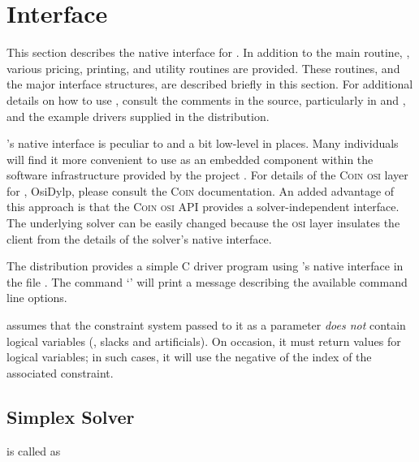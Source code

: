 \section{\dylp Interface}
\label{sec:DylpInterface}

This section describes the native interface for \dylp.
In addition to the main routine, , various pricing, printing, and
utility routines are provided.
These routines, and the major interface structures, are described briefly
in this section.
For additional details on how to use \dylp, consult the comments
in the source, particularly in  and ,
and the example drivers supplied in the distribution.

\dylp's native interface is peculiar to \dylp and a bit low-level in places.
Many individuals will find it more convenient to use \dylp as an
embedded component within the software infrastructure provided by
the \coin project \cite{COIN}.
For details of the \textsc{Coin osi} layer for \dylp, OsiDylp, please consult
the \textsc{Coin}
documentation.
An added advantage of this approach is that the \textsc{Coin osi} API provides
a solver-independent interface.
The underlying solver can be easily changed because the \textsc{osi} layer
insulates
the client from the details of the solver's native interface.

The \dylp distribution provides a simple C driver program using \dylp's
native interface in the file .
The command `' will print a message describing the
available command line options.

\dylp assumes that the constraint system passed to it as a parameter
\textit{does not} contain logical variables (\ie, slacks and artificials).
On occasion, it must return values for logical variables; in such cases,
it will use the negative of the index of the associated constraint.

\subsection{Simplex Solver}
\label{SimplexSolver}

\dylp is called as

